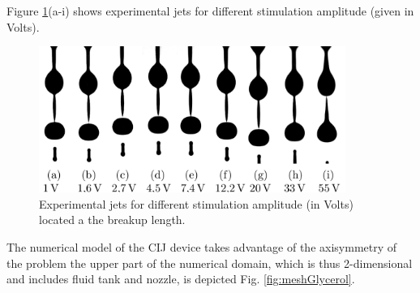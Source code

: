 \documentclass[twocolumn,10pt]{asme2ej}
\begin{document}
Figure \ref{fig:glycerolCIJExp}(a-i) shows experimental jets for different stimulation amplitude (given in Volts). 

\begin{figure}[]
    \centering
    \includegraphics[width=10cm]{Glycerol/gouttes_exp.png}
    \caption{Experimental jets for different stimulation amplitude (in Volts) located a the breakup length.}
    \label{fig:glycerolCIJExp}
\end{figure}

The numerical model of the CIJ device takes advantage of the axisymmetry of the problem the upper part of the numerical domain, which is thus 2-dimensional and includes fluid tank and nozzle, is depicted Fig. \ref{fig:meshGlycerol}. 
\end{document}
